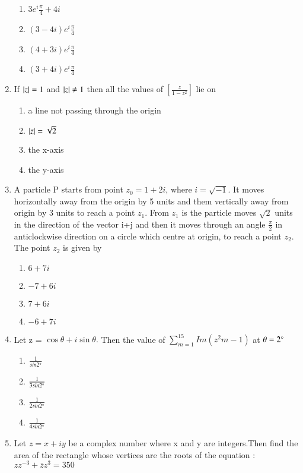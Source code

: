 \begin{enumerate}[label=\arabic*.,ref=\thesubsection.\theenumi]
    \begin{enumerate}
    \item   $3e^i\frac{\pi}{4}+4i$ 
    \item   $(3-4i)e^i\frac{\pi}{4}$
    \item   $(4+3i)e^i\frac{\pi}{4}$
    \item   $(3+4i)e^i\frac{\pi}{4}$
    \end{enumerate}
    \item If $\left\vert z\right\vert = 1$ and $\left\vert z\right\vert \neq 1$ then all the values of $[\frac{z}{1-z^2}]$ lie on 
    \begin{enumerate}
    \item   a line not passing through the origin 
    \item   $\left\vert z\right\vert=\sqrt 2$
    \item   the x-axis
    \item   the y-axis    
    \end{enumerate}     
    \item  A particle P starts from point $z_0 = 1+2i$, where $i = \sqrt {-1}$. It moves horizontally away from the origin by 5 units and them vertically away from origin by 3 units to reach a point $z_1$. From $z_1$ is the particle moves $\sqrt{2}$ units in the direction of the vector i+j and then it moves through an angle $\frac{\pi}{2}$ in anticlockwise direction on a circle which centre at origin, to reach a point $z_2$. The point $z_2$ is given by
    \begin{enumerate}  
    \item   $6+7i$ 
    \item   $-7+6i$
    \item   $7+6i$
    \item   $-6+7i$
    \end{enumerate}
    \item Let z = $\cos\theta+i\sin\theta.$ Then the value of $\sum_{m=1}^{15}Im(z^2m-1)$
    at $\theta = 2\degree$ 
    \begin{enumerate}
    \item   $\frac{1}{sin 2 \degree }$ 
    \item   $\frac{1}{3sin 2 \degree }$
    \item   $\frac{1}{2sin 2 \degree }$    
    \item   $\frac{1}{4sin 2 \degree }$
    \end{enumerate}
    \item Let $z = x+iy$ be a complex number where x and y are integers.Then find the area of the rectangle whose vertices are the roots of the equation : $zz^{-3} + \bar z z ^3 = 350$ 

\end{enumerate}
